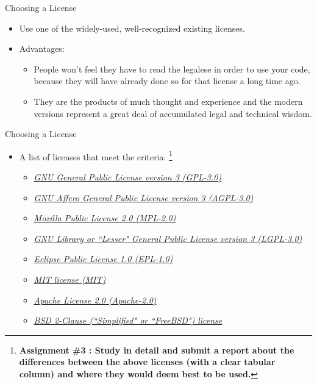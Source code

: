 \documentclass{beamer}
\begin{document}
\begin{frame}{Choosing a License}
\begin{itemize}
	\item Use one of the widely-used, well-recognized existing licenses. 
	\item Advantages:
	\begin{itemize}
		\item People won't feel they have to read the legalese in order to use your code, because they will have already done so for that license a long time ago. 
		\item They are the products of much thought and experience and the modern versions represent a great deal of accumulated legal and technical wisdom.
	\end{itemize}
\end{itemize}
\end{frame}

\begin{frame}{Choosing a License}
\begin{itemize}
	\item A list of licenses that meet the criteria: \footnote{\textbf{\tiny{Assignment \#3 : Study in detail and submit a report about the differences between the above licenses (with a clear tabular column) and where they would deem best to be used.}}}
	\begin{itemize}
		\item \emph{\href{http://www.gnu.org/licenses/gpl.html}{\alert{GNU General Public License version 3 (GPL-3.0)}}}
		\item \emph{\href{http://www.gnu.org/licenses/agpl.html}{\alert{GNU Affero General Public License version 3 (AGPL-3.0)}}}
		\item \emph{\href{https://www.mozilla.org/MPL/}{Mozilla Public License 2.0 (MPL-2.0)}}
		\item \emph{\href{http://www.gnu.org/licenses/lgpl.html}{GNU Library or ``Lesser" General Public License version 3 (LGPL-3.0)}}
		\item \emph{\href{https://www.eclipse.org/legal/epl-v10.html}{Eclipse Public License 1.0 (EPL-1.0)}}
		\item \emph{\href{http://opensource.org/licenses/MIT}{\alert{MIT license (MIT)}}}
		\item \emph{\href{http://apache.org/licenses/LICENSE-2.0}{Apache License 2.0 (Apache-2.0)}}
		\item \emph{\href{http://opensource.org/licenses/BSD-2-Clause}{BSD 2-Clause (``Simplified" or ``FreeBSD") license}}	
	\end{itemize}
\end{itemize}
\end{frame}
	
\end{document}
